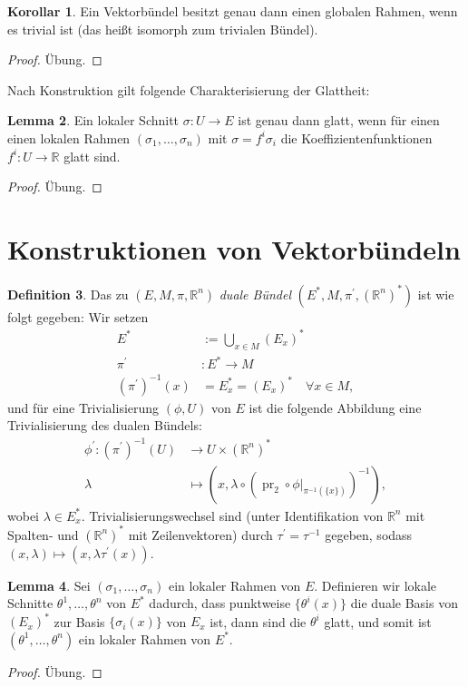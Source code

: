 \documentclass[a4paper]{scrbook}
\numberwithin{equation}{chapter}
\DeclareMathOperator{\pr}{pr}
\newcommand{\R}{\mathbb{R}}
\theoremstyle{definition}
\newtheorem{defn}{Definition}[section]
\newtheorem{lemma}[defn]{Lemma}
\newtheorem{kor}[defn]{Korollar}
\newcommand{\bewUeb}{\begin{proof}Übung.\end{proof}}
\begin{document}
		\begin{kor}
			Ein Vektorbündel besitzt genau dann einen globalen Rahmen, wenn es trivial ist (das heißt isomorph zum trivialen Bündel).
			\bewUeb
		\end{kor}
		Nach Konstruktion gilt folgende Charakterisierung der Glattheit:
		\begin{lemma} \label{lemma:schnitt_glatt_koeff_glatt}
			Ein lokaler Schnitt $\sigma\colon U\rightarrow E$ ist genau dann glatt, wenn für einen einen lokalen Rahmen $(\sigma_1,\ldots,\sigma_n)$ mit $\sigma=f^i\sigma_i$ die Koeffizientenfunktionen $f^i\colon U\rightarrow \R$ glatt sind.
			\bewUeb
		\end{lemma}
		
	\section{Konstruktionen von Vektorbündeln}
		\begin{defn}
			Das zu $(E,M,\pi,\R^{n})$ \emph{duale Bündel} $(E^*,M,\pi^{\prime},(\R^n)^*)$ ist wie folgt gegeben: Wir setzen
			\begin{align*}
				E^*&:=\bigcup_{x\in M}(E_{x})^*\\
				\pi^{\prime}&\colon E^*\rightarrow M\\
				(\pi^{\prime})^{-1}(x)&=E^*_x=(E_{x})^*\quad \forall x\in M,
			\end{align*}
			und für eine Trivialisierung $(\phi,U)$ von $E$ ist die folgende Abbildung eine Trivialisierung des dualen Bündels:
			\begin{align*}
				\phi^{\prime}\colon(\pi^{\prime})^{-1}(U)&\rightarrow U\times (\R^n)^*\\
				\lambda&\mapsto\left(x,\lambda\circ({\pr_2}\circ\phi\vert_{\pi^{-1}(\lbrace x\rbrace)})^{-1}\right),
			\end{align*}
			wobei $\lambda\in E_x^*$. Trivialisierungswechsel sind (unter Identifikation von $\R^n$ mit Spalten- und $(\R^n)^*$ mit Zeilenvektoren) durch $\tau^{\prime}=\tau^{-1}$ gegeben, sodass $(x,\lambda)\mapsto(x,\lambda\tau^{\prime}(x))$.
		\end{defn}
	
		\begin{lemma} \label{lemma:rahmen_dual}
			Sei $(\sigma_1,\dots,\sigma_n)$ ein lokaler Rahmen von $E$. Definieren wir lokale Schnitte $\theta^1, \dots, \theta^n$ von $E^*$ dadurch, dass punktweise $\{\theta^i(x)\}$ die duale Basis von $(E_x)^*$ zur Basis $\{\sigma_i(x)\}$ von $E_x$ ist, dann sind die $\theta^i$ glatt, und somit ist $(\theta^1,\dots,\theta^n)$ ein lokaler Rahmen von $E^*$.
			\bewUeb
		\end{lemma}
	
\end{document}
